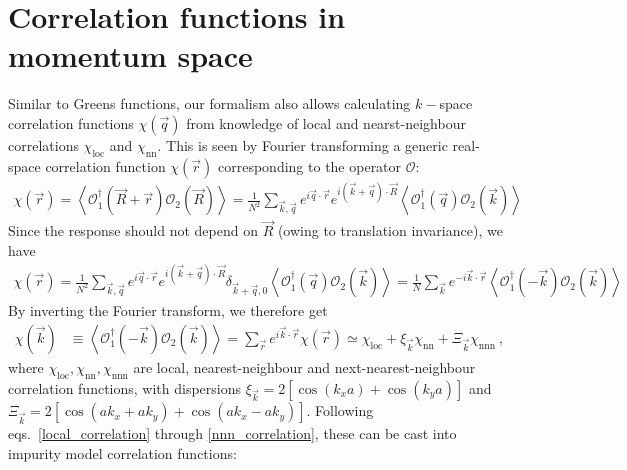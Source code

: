 \documentclass{report}
\numberwithin{equation}{section}
\begin{document}
\section{Correlation functions in momentum space}
Similar to Greens functions, our formalism also allows calculating \(k-\)space correlation functions \(\chi(\vec q)\) from knowledge of local and nearst-neighbour correlations \(\chi_\text{loc}\) and \(\chi_\text{nn}\). This is seen by Fourier transforming a generic real-space correlation function \(\chi(\vec r)\) corresponding to the operator \(\mathcal{O}\):
\begin{equation}\begin{aligned}
	\chi(\vec r) = \left<\mathcal{O}_1^\dagger (\vec R + \vec r) \mathcal{O}_2(\vec R)\right> = \frac{1}{N^2}\sum_{\vec k, \vec q} e^{i \vec q \cdot \vec r}e^{i \left(\vec k + \vec q\right) \cdot \vec R}\left<\mathcal{O}_1^\dagger (\vec q) \mathcal{O}_2(\vec k)\right>
\end{aligned}\end{equation}
Since the response should not depend on \(\vec R\) (owing to translation invariance), we have
\begin{equation}\begin{aligned}
	\chi(\vec r) = \frac{1}{N^2}\sum_{\vec k, \vec q} e^{i \vec q \cdot \vec r}e^{i \left(\vec k + \vec q\right) \cdot \vec R}\delta_{\vec k + \vec q, 0}\left<\mathcal{O}_1^\dagger (\vec q) \mathcal{O}_2(\vec k)\right> = \frac{1}{N}\sum_{\vec k} e^{-i \vec k \cdot \vec r}\left<\mathcal{O}_1^\dagger (-\vec k) \mathcal{O}_2(\vec k)\right>
\end{aligned}\end{equation}
By inverting the Fourier transform, we therefore get
\begin{equation}\begin{aligned}
	\chi(\vec k) &\equiv \left<\mathcal{O}_1^\dagger (-\vec k) \mathcal{O}_2(\vec k)\right> = \sum_{\vec r}e^{i \vec{k}\cdot\vec{r}} \chi(\vec r) \simeq \chi_\text{loc} + \xi_{\vec k} \chi_\text{nn} + \Xi_{\vec k}\chi_\text{nnn}~,
\end{aligned}\end{equation}
where \(\chi_\text{loc},\chi_\text{nn},\chi_\text{nnn}\) are local, nearest-neighbour and next-nearest-neighbour correlation functions, with dispersions \(\xi_{\vec k} = 2\left[\cos(k_x a) + \cos\left(k_y a\right)\right] \) and \(\Xi_{\vec k} = 2\left[\cos \left(ak_x + ak_y\right) + \cos \left( ak_x - ak_y \right) \right] \). Following eqs.~\ref{local_correlation} through \ref{nnn_correlation}, these can be cast into impurity model correlation functions:
\end{document}
